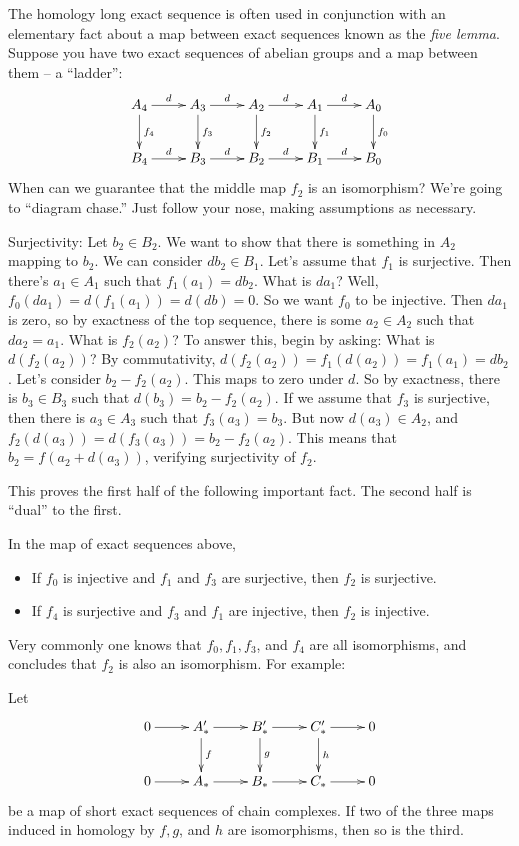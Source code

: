 The homology long exact sequence is often used in conjunction with 
an elementary fact about a map between exact sequences known as the 
{\em five lemma}.
Suppose you have two exact sequences of abelian groups and a map between them
-- a ``ladder'':
\begin{equation*}
\xymatrix{A_4\ar[r]^d\ar[d]^{f_4} & A_3\ar[r]^d\ar[d]^{f_3} & A_2\ar[r]^d\ar[d]^{f_2} & A_1\ar[r]^d\ar[d]^{f_1} & A_0\ar[d]^{f_0}\\
B_4\ar[r]^d & B_3\ar[r]^d & B_2\ar[r]^d & B_1\ar[r]^d & B_0}
\end{equation*}
When can we guarantee that the middle map $f_2$ is an isomorphism? 
We're going to ``diagram chase.'' Just follow your nose, making assumptions 
as necessary.

Surjectivity:
Let $b_2\in B_2$. We want to show that there is something in $A_2$ mapping to $b_2$. We can consider $db_2\in B_1$. Let's assume that $f_1$ is surjective. Then there's $a_1\in A_1$ such that $f_1(a_1)=db_2$. What is $da_1$? Well, $f_0(da_1)=d(f_1(a_1))=d(db)=0$. So we want $f_0$ to be injective. Then $da_1$ is zero, so by exactness of the top sequence, there is some $a_2\in A_2$ such that $da_2=a_1$. What is $f_2(a_2)$? To answer this, begin by asking: What is $d(f_2(a_2))$? By commutativity, $d(f_2(a_2))=f_1(d(a_2))=f_1(a_1)=db_2$. Let's consider $b_2-f_2(a_2)$. This maps to zero under $d$. So by exactness, there is $b_3\in B_3$ such that $d(b_3)=b_2-f_2(a_2)$. If we assume that $f_3$ is surjective, then there is $a_3\in A_3$ such that $f_3(a_3)=b_3$. But now $d(a_3)\in A_2$, and $f_2(d(a_3))=d(f_3(a_3))=b_2-f_2(a_2)$. This means that $b_2=f(a_2+d(a_3))$, verifying surjectivity of $f_2$. 

This proves the first half of the following important fact. The second half 
is ``dual'' to the first. 
\begin{prop}
In the map of exact sequences above, 
\begin{itemize}
\item If $f_0$ is injective and $f_1$ and $f_3$ are surjective, then $f_2$ is surjective.
\item If $f_4$ is surjective and $f_3$ and $f_1$ are injective, then $f_2$ is injective.
\end{itemize}
\end{prop}

Very commonly one knows that $f_0,f_1,f_3$, and $f_4$ are all isomorphisms, 
and concludes that $f_2$ is also an isomorphism. For example:
\begin{corollary}
Let 
\[
\xymatrix{
0 \ar[r] & A'_* \ar[r] \ar[d]^f & B'_* \ar[r] \ar[d]^g & C'_* \ar[r] \ar[d]^h 
& 0 \\
0 \ar[r] & A_* \ar[r] & B_* \ar[r] & C_* \ar[r]  & 0 
}\]
be a map of short exact sequences of chain complexes. If two of the three maps induced in homology by $f,g$, and $h$ are isomorphisms, then so is the third. 
\end{corollary}

